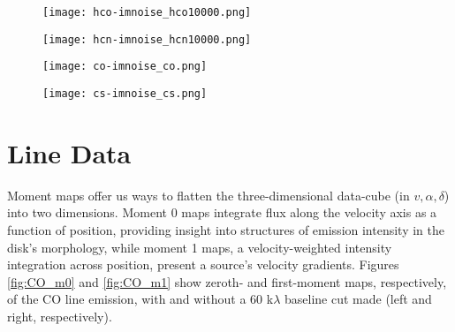 \begin{figure}
  \centering
  \begin{minipage}{.48\textwidth}
    \centering
    \texttt{[image: hco-imnoise\_hco10000.png]}
    \label{fig:noise-profile_hco}
  \end{minipage}%
  \begin{minipage}{.48\textwidth}
    \centering
    \texttt{[image: hcn-imnoise\_hcn10000.png]}
    \label{fig:noise-profile_hcn}
  \end{minipage}%
  \par\medskip
  \begin{minipage}{.48\textwidth}
    \centering
    \texttt{[image: co-imnoise\_co.png]}
    \label{fig:noise-profile_co}
  \end{minipage}%
  \begin{minipage}{.48\textwidth}
    \centering
    \texttt{[image: cs-imnoise\_cs.png]}
    \label{fig:noise-profile_cs}
  \end{minipage}
  \label{fig:noise-profiles}
\end{figure}





\section{Line Data}
\label{section:line_data}

Moment maps offer us ways to flatten the three-dimensional data-cube (in $v, \alpha, \delta$) into two dimensions. Moment 0 maps integrate flux along the velocity axis as a function of position, providing insight into structures of emission intensity in the disk's morphology, while moment 1 maps, a velocity-weighted intensity integration across position, present a source's velocity gradients. Figures \ref{fig:CO_m0} and \ref{fig:CO_m1} show zeroth- and first-moment maps, respectively, of the CO line emission, with and without a 60 k$\lambda$ baseline cut made (left and right, respectively).

